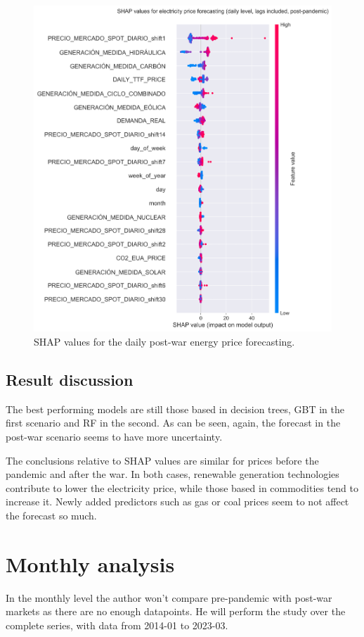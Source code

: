 \begin{figure}[H]
\centering
    \centering
    \includegraphics[width=0.7\linewidth]{images/analysis/shap-daily-post}
    \caption{SHAP values for the daily post-war energy price forecasting.}
    \label{fig:shap-daily-post}
\end{figure}

\subsection{Result discussion}

The best performing models are still those based in decision trees, GBT in the first scenario and RF in the second. As can be seen, again, the forecast in the post-war scenario seems to have more uncertainty.

The conclusions relative to SHAP values are similar for prices before the pandemic and after the war. In both cases, renewable generation technologies contribute to lower the electricity price, while those based in commodities tend to increase it. Newly added predictors such as gas or coal prices seem to not affect the forecast so much.


\section{Monthly analysis}
In the monthly level the author won't compare pre-pandemic with post-war markets as there are no enough datapoints. He will perform the study over the complete series, with data from 2014-01 to 2023-03.

